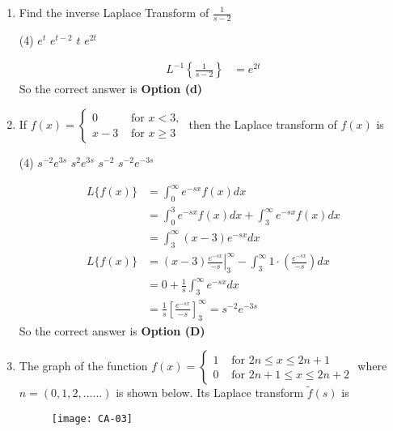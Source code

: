 \begin{enumerate}
\item Find the inverse Laplace Transform of $\frac{1}{s-2}$
\begin{tasks}(4)
	\task[\textbf{a.}]$e^{t}$
	\task[\textbf{b.}]$e^{t-2}$
	\task[\textbf{c.}]$t$
	\task[\textbf{d.}] $e^{2 t}$
\end{tasks}
\begin{answer}
	$$
	\begin{aligned}
	L^{-1}\left\lbrace  \frac{1}{s-2}\right\rbrace &=e^{2 t}
\end{aligned}
$$
	So the correct answer is \textbf{Option (d)}
\end{answer}
\item If $f(x)=\left\{\begin{array}{ll}0 & \text { for } x<3, \\ x-3 & \text { for } x \geq 3\end{array}\right.$ then the Laplace transform of $f(x)$ is
\begin{tasks}(4)
	\task[\textbf{A.}] $s^{-2} e^{3 s}$
	\task[\textbf{B.}] $s^{2} e^{3 s}$
	\task[\textbf{C.}] $s^{-2}$
	\task[\textbf{D.}] $s^{-2} e^{-3 s}$
\end{tasks}
\begin{answer}
	$$
	\begin{aligned}
	L\{f(x)\}&=\int_{0}^{\infty} e^{-s x} f(x) d x\\&=\int_{0}^{3} e^{-s x} f(x) d x+\int_{3}^{\infty} e^{-s x} f(x) d x\\&=\int_{3}^{\infty}(x-3) e^{-s x} d x\\
	L\{f(x)\}&=\left.(x-3) \frac{e^{-s x}}{-s}\right|_{3} ^{\infty}-\int_{3}^{\infty} 1 \cdot\left(\frac{e^{-s x}}{-s}\right) d x\\&=0+\frac{1}{s} \int_{3}^{\infty} e^{-s x} d x\\&=\frac{1}{s}\left[\frac{e^{-s x}}{-s}\right]_{3}^{\infty}=s^{-2} e^{-3 s}
	\end{aligned}
$$
	So the correct answer is \textbf{Option (D)}
\end{answer}
\item The graph of the function $f(x)=\left\{\begin{array}{ll}1 & \text { for } 2 n \leq x \leq 2 n+1 \\ 0 & \text { for } 2 n+1 \leq x \leq 2 n+2\end{array}\right.$ where $n=(0,1,2, \ldots \ldots)$ is shown below. Its Laplace transform $\tilde{f}(s)$ is
\begin{figure}[H]
	\centering
	\texttt{[image: CA-03]}

\end{figure}
\end{enumerate}
